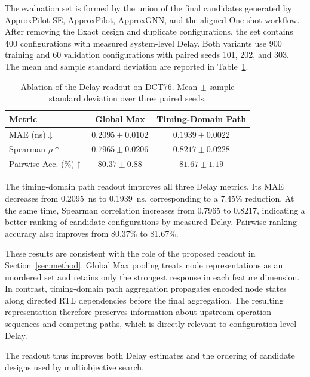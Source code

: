 The evaluation set is formed by the union of the final candidates
generated by ApproxPilot-SE, ApproxPilot, ApproxGNN, and the aligned
One-shot workflow. After removing the Exact design and duplicate
configurations, the set contains 400 configurations with measured
system-level Delay. Both variants use 900 training and 60 validation
configurations with paired seeds 101, 202, and 303. The mean and sample standard
deviation are reported in Table~\ref{tab:delay_ablation}.

\begin{table}[t]
\centering
\caption{Ablation of the Delay readout on DCT76. Mean $\pm$ sample standard deviation over three paired seeds.}
\label{tab:delay_ablation}
\footnotesize
\setlength{\tabcolsep}{4pt}
\renewcommand{\arraystretch}{1.08}

\begin{tabular*}{\columnwidth}{@{\extracolsep{\fill}} lcc @{}}
\toprule
\textbf{Metric}
& \textbf{Global Max}
& \textbf{Timing-Domain Path} \\
\midrule
MAE (ns)$\downarrow$
& $0.2095 \pm 0.0102$
& $\mathbf{0.1939 \pm 0.0022}$
\\
Spearman $\rho$$\uparrow$
& $0.7965 \pm 0.0206$
& $\mathbf{0.8217 \pm 0.0228}$
\\
Pairwise Acc. (\%)$\uparrow$
& $80.37 \pm 0.88$
& $\mathbf{81.67 \pm 1.19}$ \\
\bottomrule
\end{tabular*}

\end{table}

The timing-domain path readout improves all three Delay metrics.
Its MAE decreases from 0.2095~ns to 0.1939~ns, corresponding to
a 7.45\% reduction. At the same time, Spearman correlation
increases from 0.7965 to 0.8217, indicating a better ranking of
candidate configurations by measured Delay. Pairwise ranking
accuracy also improves from 80.37\% to 81.67\%.

These results are consistent with the role of the proposed readout
in Section~\ref{sec:method}. Global Max pooling treats node
representations as an unordered set and retains only the strongest
response in each feature dimension. In contrast, timing-domain
path aggregation propagates encoded node states along directed RTL
dependencies before the final aggregation. The resulting
representation therefore preserves information about upstream
operation sequences and competing paths, which is directly
relevant to configuration-level Delay.

The readout thus improves both Delay estimates and the ordering
of candidate designs used by multiobjective search.
